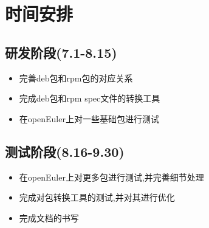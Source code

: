 \documentclass{article}
\begin{document}
\section{时间安排}
\subsection{研发阶段(7.1-8.15)}
\begin{itemize}
    \item 完善deb包和rpm包的对应关系
    \item 完成deb包和rpm spec文件的转换工具
    \item 在openEuler上对一些基础包进行测试
\end{itemize}

\subsection{测试阶段(8.16-9.30)}
\begin{itemize}
    \item 在openEuler上对更多包进行测试,并完善细节处理
    \item 完成对包转换工具的测试,并对其进行优化
    \item 完成文档的书写
\end{itemize}
\end{document}
